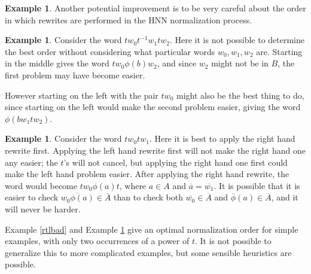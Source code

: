 \documentclass[12pt]{article} %
\theoremstyle{definition}
\theoremstyle{definition}
\theoremstyle{definition}
\theoremstyle{definition}
\newtheorem{exmpl}[thm]{Example}
\begin{document}
\begin{exmpl}
Another potential improvement is to be very careful about the order in which rewrites
are performed in the HNN normalization process.


\end{exmpl}

\begin{exmpl}
  Consider the word $tw_0t^{-1}w_1tw_2$. Here it is not possible to determine the best order without
  considering what particular words $w_0, w_1, w_2$ are. Starting in the middle gives the word
  $tw_0\phi(b)w_2$, and since $w_2$ might not be in $B$, the first problem may have become easier.

  However starting on the left with the pair $tw_0$
  might also be the best thing to do, since starting on the left would
  make the second problem easier, giving the word $\phi(bw_1 t w_2)$.
\end{exmpl}

\begin{exmpl}\label{ltrbad2}
  Consider the word $tw_0tw_1$. Here it is best to apply the right hand rewrite first.
  Applying the left hand rewrite first will not make the right hand one any easier; the $t$'s will
  not cancel, but applying the right hand one first could make the left hand problem easier.
  After applying the right hand rewrite, the word would become $tw_0\phi(a)t$, where $a \in A$
  and $\overline{a} = \overline{w_1}$. It is possible that it is easier to check
  $\overline{w_0\phi(a)} \in \overline{A}$
  than to check both $\overline{w_0} \in \overline{A}$ and $\overline{\phi}(a) \in \overline{A}$,
  and it will never be harder.
\end{exmpl}

Example \ref{rtlbad} and Example \ref{ltrbad2} give an optimal normalization order
for simple examples, with only two occurrences of a power of $t$.
It is not possible to generalize this to more complicated examples,
but some sensible heuristics are possible.
\end{document}
